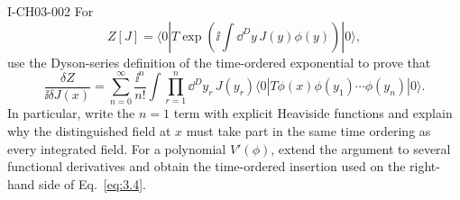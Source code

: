 \begin{exercise}{I-CH03-002}
For
\[
 Z[J]=\langle0|T\exp\!\left(\ii\int\dd^D y\,J(y)\phi(y)\right)|0\rangle,
\]
use the Dyson-series definition of the time-ordered exponential to prove that
\[
 \frac{\delta Z}{\ii\delta J(x)}
 =\sum_{n=0}^{\infty}\frac{\ii^n}{n!}
 \int\prod_{r=1}^n\dd^D y_r\,J(y_r)
 \langle0|T\phi(x)\phi(y_1)\cdots\phi(y_n)|0\rangle.
\]
In particular, write the $n=1$ term with explicit Heaviside functions and
explain why the distinguished field at $x$ must take part in the same time
ordering as every integrated field.  For a polynomial $V'(\phi)$, extend the
argument to several functional derivatives and obtain the time-ordered
insertion used on the right-hand side of Eq.~\eqref{eq:3.4}.
\end{exercise}
